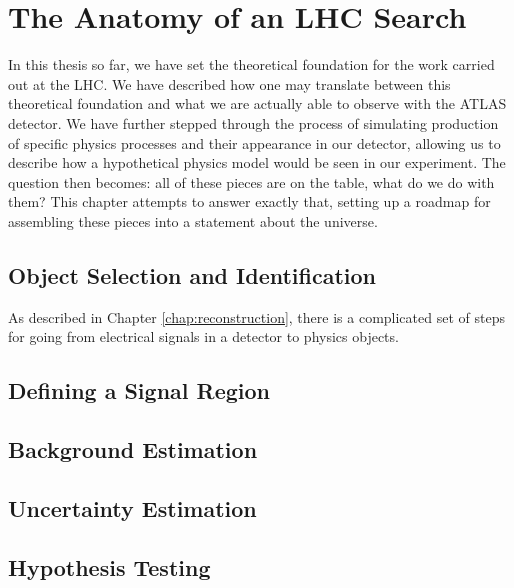 \chapter{The Anatomy of an LHC Search}
In this thesis so far, we have set the theoretical foundation for the work 
carried out at the LHC. We have described how one may translate between this 
theoretical foundation and what we are actually able to observe with the ATLAS 
detector. We have further stepped through the process of simulating production of 
specific physics processes and their appearance in our detector, allowing us to 
describe how a hypothetical physics model would be seen in our experiment. The question 
then becomes: all of these pieces are on the table, what do we do with them? This chapter
attempts to answer exactly that, setting up a roadmap for assembling these pieces into 
a statement about the universe.

\section{Object Selection and Identification}
As described in Chapter \ref{chap:reconstruction}, there is a complicated set of steps for 
going from electrical signals in a detector to physics objects.

\section{Defining a Signal Region}
\section{Background Estimation}
\section{Uncertainty Estimation}
\section{Hypothesis Testing}
